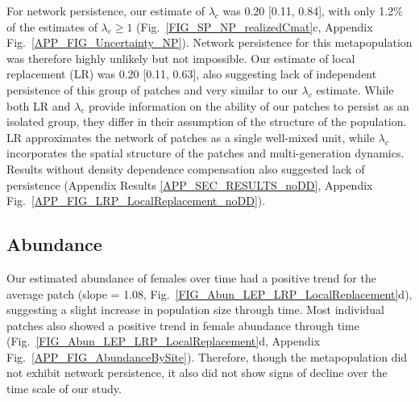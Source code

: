 \documentclass[12pt, oneside]{article}   	%
\begin{document}
For network persistence, our estimate of $\lambda_{c}$ was 0.20 [0.11, 0.84], with only 1.2\% of the estimates of $\lambda_c \geq 1$ (Fig.\ \ref{FIG_SP_NP_realizedCmat}c, Appendix Fig.\ \ref{APP_FIG_Uncertainty_NP}). Network persistence for this metapopulation was therefore highly unlikely but not impossible. Our estimate of local replacement (LR) was 0.20 [0.11, 0.63], also suggesting lack of independent persistence of this group of patches and very similar to our $\lambda_{c}$ estimate. While both LR and $\lambda_{c}$ provide information on the ability of our patches to persist as an isolated group, they differ in their assumption of the structure of the population. LR approximates the network of patches as a single well-mixed unit, while $\lambda_{c}$ incorporates the spatial structure of the patches and multi-generation dynamics. Results without density dependence compensation also suggested lack of persistence (Appendix Results \ref{APP_SEC_RESULTS_noDD}, Appendix Fig.\ \ref{APP_FIG_LRP_LocalReplacement_noDD}).


\subsection*{Abundance}

Our estimated abundance of females over time had a positive trend for the average patch (slope = 1.08, Fig.\ \ref{FIG_Abun_LEP_LRP_LocalReplacement}d), suggesting a slight increase in population size through time. Most individual patches also showed a positive trend in female abundance through time (Fig.\ \ref{FIG_Abun_LEP_LRP_LocalReplacement}d, Appendix Fig.\ \ref{APP_FIG_AbundanceBySite}). Therefore, though the metapopulation did not exhibit network persistence, it also did not show signs of decline over the time scale of our study. 
\end{document}
